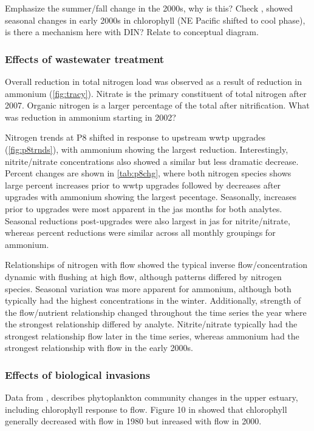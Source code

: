 \documentclass[letterpaper,12pt,oneside]{article}\usepackage[]{graphicx}\usepackage[]{color}
\begin{document}
Emphasize the summer/fall change in the 2000s, why is this?  Check \citep{Cloern07}, showed seasonal changes in early 2000s in chlorophyll (NE Pacific shifted to cool phase), is there a mechanism here with DIN? Relate to conceptual diagram.

\subsubsection{Effects of wastewater treatment}

Overall reduction in total nitrogen load was observed as a result of reduction in ammonium (\cref{fig:tracy}).  Nitrate is the primary constituent of total nitrogen after 2007.  Organic nitrogen is a larger percentage of the total after nitrification. What was reduction in ammonium starting in 2002? 

Nitrogen trends at P8 shifted in response to upstream \ac{wwtp} upgrades (\cref{fig:p8trnds}), with ammonium showing the largest reduction.  Interestingly, nitrite/nitrate concentrations also showed a similar but less dramatic decrease.  Percent changes are shown in \cref{tab:p8chg}, where both nitrogen species shows large percent increases prior to \ac{wwtp} upgrades followed by decreases after upgrades with ammonium showing the largest pecentage.  Seasonally, increases prior to upgrades were most apparent in the \ac{jas} months for both analytes.  Seasonal reductions post-upgrades were also largest in \ac{jas} for nitrite/nitrate, whereas percent reductions were similar across all monthly groupings for ammonium.  

Relationships of nitrogen with flow showed the typical inverse flow/concentration dynamic with flushing at high flow, although patterns differed by nitrogen species.  Seasonal variation was more apparent for ammonium, although both typically had the highest concentrations in the winter.  Additionally, strength of the flow/nutrient relationship changed throughout the time series the year where the strongest relationship differed by analyte.  Nitrite/nitrate typically had the strongest relationship flow later in the time series, whereas ammonium had the strongest relationship with flow in the early 2000s.  

\subsubsection{Effects of biological invasions}

Data from \citep{Crauder16}, \citet{Jassby08} describes phytoplankton community changes in the upper estuary, including chlorophyll response to flow.  Figure 10 in \citet{Jassby08} showed that chlorophyll generally decreased with flow in 1980 but inreased with flow in 2000.
\end{document}

